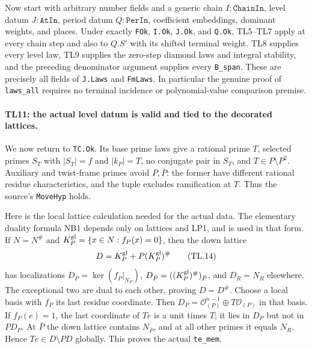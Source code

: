 Now start with arbitrary number fields and a generic chain
$I:\texttt{ChainIn}$, level datum $J:\texttt{AtIn}$, period datum
$Q:\texttt{PerIn}$, coefficient embeddings, dominant weights, and
places. Under exactly \texttt{FOk}, \texttt{I.Ok}, \texttt{J.Ok},
and \texttt{Q.Ok}, TL5--TL7 apply at every chain step and also to
$Q.S'$ with its shifted terminal weight. TL8 supplies every level
law, TL9 supplies the zero-step diamond laws and integral stability,
and the preceding denominator argument supplies every
\texttt{B\_span}. These are precisely all fields of
\texttt{J.Laws} and \texttt{FmLaws}. In particular the genuine
proof of \texttt{laws\_all} requires no terminal incidence or
polynomial-value comparison premise.

\paragraph{TL11: the actual level datum is valid and tied to the
decorated lattices.}
We now return to \texttt{TC.Ok}. Its base prime laws give a rational
prime $T$, selected primes $S_T$ with $|S_T|=f$ and $|k_P|=T$,
no conjugate pair in $S_T$, and $T\in P\setminus P^2$.
Auxiliary and twist-frame primes avoid $P,\bar P$: the former have
different rational residue characteristics, and the tuple excludes
ramification at $T$. Thus the source's \texttt{MoveHyp} holds.

Here is the local lattice calculation needed for the actual data.
The elementary duality formula NB1 depends only on lattices and
LP1, and is used in that form. If $N=N^\#$ and
$K_P^{\rm gl}=\{x\in N:f_P(x)=0\}$, then the down lattice
\[
 D=K_P^{\rm gl}+P(K_P^{\rm gl})^\#                \tag{TL.14}
\]
has localizations $D_P=\ker(f_P|_{N_P})$,
$D_{\bar P}=((K_P^{\rm gl})^\#)_{\bar P}$, and $D_R=N_R$ elsewhere.
The exceptional two are dual to each other, proving $D=D^\#$.
Choose a local basis with $f_P$ its last residue coordinate. Then
$D_P=\mathcal O_{(P)}^{n-1}\oplus T\mathcal O_{(P)}$ in that basis.
If $f_P(e)=1$, the last coordinate of $Te$ is a unit times $T$;
it lies in $D_P$ but not in $PD_P$. At $\bar P$ the down lattice
contains $N_{\bar P}$, and at all other primes it equals $N_R$.
Hence $Te\in D\setminus PD$ globally. This proves the actual
\texttt{te\_mem}.

